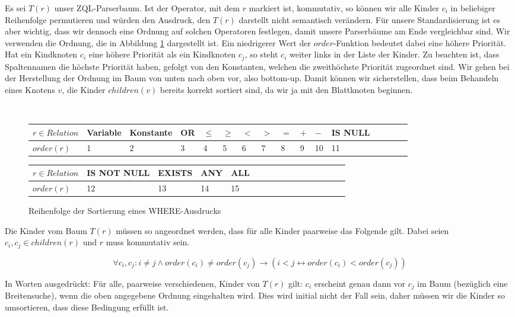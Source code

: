 Es sei $T(r)$ unser ZQL-Parserbaum. Ist der Operator, mit dem $r$ markiert ist, kommutativ, so können wir alle Kinder $c_i$ in beliebiger Reihenfolge permutieren und würden den Ausdruck, den $T(r)$ darstellt nicht semantisch verändern. Für unsere Standardisierung ist es aber wichtig, dass wir dennoch eine Ordnung auf solchen Operatoren festlegen, damit unsere Parserbäume am Ende vergleichbar sind. Wir verwenden die Ordnung, die in Abbildung \ref{fig:sortorder} dargestellt ist. Ein niedrigerer Wert der $\mathit{order}$-Funktion bedeutet dabei eine höhere Priorität. Hat ein Kindknoten $c_i$ eine höhere Priorität als ein Kindknoten $c_j$, so steht $c_i$ weiter links in der Liste der Kinder. Zu beachten ist, dass Spaltennamen die höchste Priorität haben, gefolgt von den Konstanten, welchen die zweithöchste Priorität zugeordnet sind. Wir gehen bei der Herstellung der Ordnung im Baum von unten nach oben vor, also bottom-up. Damit können wir sicherstellen, dass beim Behandeln eines Knotens $v$, die Kinder $children(v)$ bereits korrekt sortiert sind, da wir ja mit den Blattknoten beginnen.

\begin{figure}[h]\
\begin{tabular}{|l|l|l|l|l|l|l|l|l|l|l|l|l|l|l|l|}
\hline
$r\in \textit{Relation}$ & Variable & Konstante & OR & $\le$ & $\ge$ & $<$ & $>$ & $=$& $+$ & $-$  & IS NULL\\\hline
$\textit{order}(r)$ & 1 & 2 & 3 & 4 & 5 & 6 & 7 & 8 & 9 & 10 & 11\\ 
\hline
\end{tabular}\newline
\begin{tabular}{|l|l|l|l|l|l|l|l|l|l|l|l|l|l|l|l|}
\hline
$r\in \textit{Relation}$ & IS NOT NULL & EXISTS & ANY & ALL  \\\hline
$\textit{order}(r)$ & 12 & 13 & 14 & 15 \\ 
\hline
\end{tabular}
\caption{Reihenfolge der Sortierung eines WHERE-Ausdrucks}
\label{fig:sortorder}
\end{figure}

Die Kinder vom Baum $T(r)$ müssen so angeordnet werden, dass für alle Kinder paarweise das Folgende gilt. Dabei seien $c_i,c_j\in\mathit{children}(r)$ und $r$ muss kommutativ sein.

$$\forall c_i,c_j : i\neq j \wedge order(c_i) \neq order(c_j) \to  ( i<j \leftrightarrow order(c_i) < order(c_j) ) $$

In Worten ausgedrückt: Für alle, paarweise verschiedenen, Kinder von $T(r)$ gilt: $c_i$ erscheint genau dann vor $c_j$ im Baum (bezüglich eine Breitensuche), wenn die oben angegebene Ordnung eingehalten wird. Dies wird initial nicht der Fall sein, daher müssen wir die Kinder so umsortieren, dass diese Bedingung erfüllt ist. 

